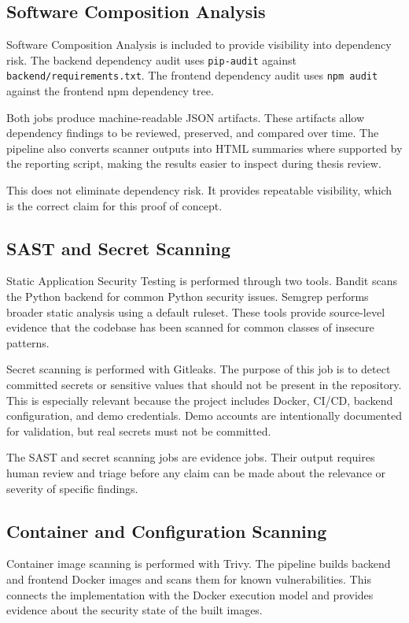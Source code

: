 \documentclass[12pt,a4paper]{report}
\begin{document}
\subsection{Software Composition Analysis}

Software Composition Analysis is included to provide visibility into dependency risk. The backend dependency audit uses \texttt{pip-audit} against \texttt{backend/requirements.txt}. The frontend dependency audit uses \texttt{npm audit} against the frontend npm dependency tree.

Both jobs produce machine-readable JSON artifacts. These artifacts allow dependency findings to be reviewed, preserved, and compared over time. The pipeline also converts scanner outputs into HTML summaries where supported by the reporting script, making the results easier to inspect during thesis review.

This does not eliminate dependency risk. It provides repeatable visibility, which is the correct claim for this proof of concept.

\subsection{SAST and Secret Scanning}

Static Application Security Testing is performed through two tools. Bandit scans the Python backend for common Python security issues. Semgrep performs broader static analysis using a default ruleset. These tools provide source-level evidence that the codebase has been scanned for common classes of insecure patterns.

Secret scanning is performed with Gitleaks. The purpose of this job is to detect committed secrets or sensitive values that should not be present in the repository. This is especially relevant because the project includes Docker, CI/CD, backend configuration, and demo credentials. Demo accounts are intentionally documented for validation, but real secrets must not be committed.

The SAST and secret scanning jobs are evidence jobs. Their output requires human review and triage before any claim can be made about the relevance or severity of specific findings.

\subsection{Container and Configuration Scanning}

Container image scanning is performed with Trivy. The pipeline builds backend and frontend Docker images and scans them for known vulnerabilities. This connects the implementation with the Docker execution model and provides evidence about the security state of the built images.
\end{document}

